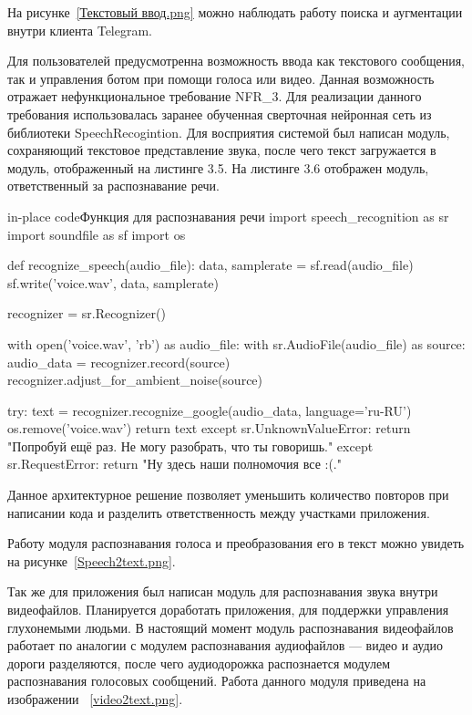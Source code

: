 На рисунке~\ref{Текстовый ввод.png} можно наблюдать работу поиска и аугментации
внутри клиента Telegram.



Для пользователей предусмотренна возможность ввода как текстового сообщения,
так и управления ботом при помощи голоса или видео. Данная возможность
отражает нефункциональное требование NFR\_3. Для реализации данного требования
использовалась заранее обученная сверточная нейронная сеть из библиотеки
SpeechRecogintion. Для восприятия системой был написан модуль, сохраняющий
текстовое представление звука, после чего текст загружается в модуль,
отображенный на листинге 3.5.
На листинге 3.6 отображен модуль, ответственный за распознавание речи.

\begin{codepiece}{in-place code}{Функция для распознавания речи}
import speech_recognition as sr
import soundfile as sf
import os

def recognize_speech(audio_file):
    data, samplerate = sf.read(audio_file)
    sf.write('voice.wav', data, samplerate)

    recognizer = sr.Recognizer()

    with open('voice.wav', 'rb') as audio_file:
        with sr.AudioFile(audio_file) as source:
            audio_data = recognizer.record(source)
            recognizer.adjust_for_ambient_noise(source)

        try:
            text = recognizer.recognize_google(audio_data, language='ru-RU')
            os.remove('voice.wav')
            return text
        except sr.UnknownValueError:
            return "Попробуй ещё раз. Не могу разобрать, что ты говоришь."
        except sr.RequestError:
            return "Ну здесь наши полномочия все :(."
\end{codepiece}

Данное архитектурное решение позволяет уменьшить 
количество повторов при написании кода и разделить ответственность между
участками приложения.

Работу модуля распознавания голоса и преобразования его в текст можно увидеть
на рисунке~\ref{Speech2text.png}.



Так же для приложения был написан модуль для распознавания звука внутри
видеофайлов. Планируется доработать приложения, для поддержки управления 
глухонемыми людьми. В настоящий момент модуль распознавания видеофайлов
работает по аналогии с модулем распознавания аудиофайлов --- видео и аудио
дороги разделяются, после чего аудиодорожка распознается модулем распознавания
голосовых сообщений. Работа данного модуля приведена на изображении
~\ref{video2text.png}.

